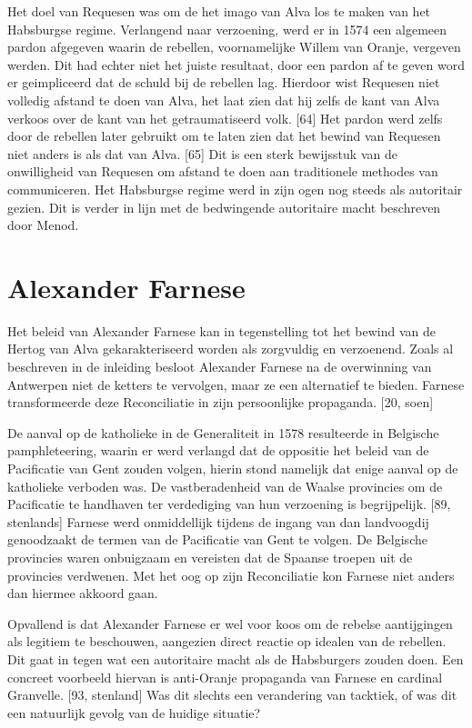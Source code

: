 \documentclass[11pt]{amsart}
\begin{document}
Het doel van Requesen was om de het imago van Alva los te maken van het Habsburgse regime. Verlangend naar verzoening,
werd er in 1574 een algemeen pardon afgegeven waarin de rebellen, voornamelijke Willem van Oranje, vergeven werden. Dit
had echter niet het juiste resultaat, door een pardon af te geven word er geimpliceerd dat de schuld bij de rebellen
lag. Hierdoor wist Requesen niet volledig afstand te doen van Alva, het laat zien dat hij zelfs de kant van Alva
verkoos over de kant van het getraumatiseerd volk. [64] Het pardon werd zelfs door de rebellen later gebruikt om te
laten zien dat het bewind van Requesen niet anders is als dat van Alva. [65] Dit is een sterk bewijsstuk van de
onwilligheid van Requesen om afstand te doen aan traditionele methodes van communiceren. Het Habsburgse regime werd in
zijn ogen nog steeds als autoritair gezien. Dit is verder in lijn met de bedwingende autoritaire macht beschreven door
Menod.

\section*{Alexander Farnese}
\noindent Het beleid van Alexander Farnese kan in tegenstelling tot het bewind van de Hertog van Alva gekarakteriseerd worden als zorgvuldig en verzoenend. Zoals al beschreven in de inleiding besloot Alexander Farnese na de overwinning van Antwerpen niet de ketters te vervolgen, maar ze een alternatief te bieden. Farnese transformeerde deze Reconciliatie in zijn persoonlijke propaganda. [20, soen]

De aanval op de katholieke in de Generaliteit in 1578 resulteerde in Belgische pamphleteering, waarin er werd verlangd
dat de oppositie het beleid van de Pacificatie van Gent zouden volgen, hierin stond namelijk dat enige aanval op de
katholieke verboden was. De vastberadenheid van de Waalse provincies om de Pacificatie te handhaven ter verdediging van
hun verzoening is begrijpelijk. [89, stenlands] Farnese werd onmiddellijk tijdens de ingang van dan landvoogdij
genoodzaakt de termen van de Pacificatie van Gent te volgen. De Belgische provincies waren onbuigzaam en vereisten dat
de Spaanse troepen uit de provincies verdwenen. Met het oog op zijn Reconciliatie kon Farnese niet anders dan hiermee
akkoord gaan.

Opvallend is dat Alexander Farnese er wel voor koos om de rebelse aantijgingen als legitiem te beschouwen, aangezien
direct reactie op idealen van de rebellen. Dit gaat in tegen wat een autoritaire macht als de Habsburgers zouden doen.
Een concreet voorbeeld hiervan is anti-Oranje propaganda van Farnese en cardinal Granvelle. [93, stenland] Was dit
slechts een verandering van tacktiek, of was dit een natuurlijk gevolg van de huidige situatie?
\end{document}
